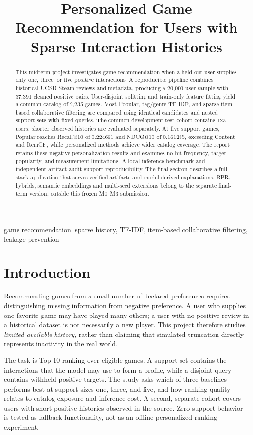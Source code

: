 \documentclass[conference,a4paper]{IEEEtran}
\title{Personalized Game Recommendation for Users with Sparse Interaction Histories}
\author{\IEEEauthorblockN{Nguyễn Bá Hùng (523K0006) and Nguyễn Bảo Long (523K0014)}
\IEEEauthorblockA{Faculty of Information Technology, Ton Duc Thang University\\
Data Mining and Knowledge Discovery --- Group 6, Class 23K50201\\
Lecturer: Hoàng Anh}}
\begin{document}
\maketitle
\begin{abstract}
This midterm project investigates game recommendation when a held-out user supplies only one, three, or five positive interactions. A reproducible pipeline combines historical UCSD Steam reviews and metadata, producing a 20,000-user sample with 37,391 cleaned positive pairs. User-disjoint splitting and train-only feature fitting yield a common catalog of 2,235 games. Most Popular, tag/genre TF-IDF, and sparse item-based collaborative filtering are compared using identical candidates and nested support sets with fixed queries. The common development-test cohort contains 123 users; shorter observed histories are evaluated separately. At five support games, Popular reaches Recall@10 of 0.224661 and NDCG@10 of 0.161285, exceeding Content and ItemCF, while personalized methods achieve wider catalog coverage. The report retains these negative personalization results and examines no-hit frequency, target popularity, and measurement limitations. A local inference benchmark and independent artifact audit support reproducibility. The final section describes a full-stack application that serves verified artifacts and model-derived explanations. BPR, hybrids, semantic embeddings and multi-seed extensions belong to the separate final-term version, outside this frozen M0--M3 submission.
\end{abstract}
\begin{IEEEkeywords}
game recommendation, sparse history, TF-IDF, item-based collaborative filtering, leakage prevention
\end{IEEEkeywords}

\section{Introduction}
Recommending games from a small number of declared preferences requires distinguishing missing information from negative preference. A user who supplies one favorite game may have played many others; a user with no positive review in a historical dataset is not necessarily a new player. This project therefore studies \emph{limited available history}, rather than claiming that simulated truncation directly represents inactivity in the real world.

The task is Top-10 ranking over eligible games. A support set contains the interactions that the model may use to form a profile, while a disjoint query contains withheld positive targets. The study asks which of three baselines performs best at support sizes one, three, and five, and how ranking quality relates to catalog exposure and inference cost. A second, separate cohort covers users with short positive histories observed in the source. Zero-support behavior is tested as fallback functionality, not as an offline personalized-ranking experiment.
\end{document}
